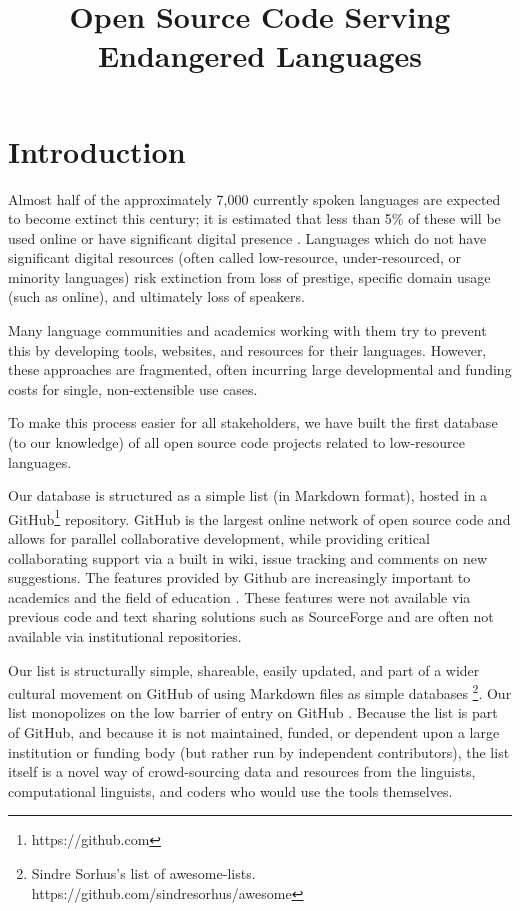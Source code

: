 \documentclass[10pt, a4paper]{article}
\title{Open Source Code Serving Endangered Languages}
\begin{document}
\maketitleabstract

\section{Introduction}

Almost half of the approximately 7,000 currently spoken languages are expected to
become extinct this century; it is estimated that less than 5\% of these will be used online or have significant digital presence \cite{kornai2013digital}. Languages which do not have significant digital resources (often called low-resource, under-resourced, or minority languages) risk extinction from loss of prestige, specific domain usage (such as online), and ultimately loss of speakers.

Many language communities and academics working with them try to prevent this by developing
tools, websites, and resources for their languages. However, these approaches are fragmented,
often incurring large developmental and funding costs for single, non-extensible use cases. 

To make this process easier for all stakeholders, we have built the first database (to our knowledge) of all open source code projects related to low-resource languages.

Our database is structured as a simple list (in Markdown format), hosted in a GitHub\footnote{https://github.com} repository. GitHub is the largest online network of open source code and allows for parallel collaborative development, while providing critical collaborating support via a built in wiki, issue tracking and comments on new suggestions. The features provided by Github are increasingly important to academics and the field of education \cite{zagalsky2015}. These features were not available via previous code and text sharing solutions such as SourceForge and are often not available via institutional repositories. 

Our list is structurally simple, shareable, easily updated, and part of a wider cultural movement on GitHub of using Markdown files as simple databases \footnote{Sindre Sorhus's list of awesome-lists. https://github.com/sindresorhus/awesome}. Our list monopolizes on the low barrier of entry on GitHub \cite{storey2014}. Because the list is part of GitHub, and because it is not maintained, funded, or dependent upon a large institution or funding body (but rather run by independent contributors), the list itself is a novel way of crowd-sourcing data and resources from the linguists, computational linguists, and coders who would use the tools themselves. 
\end{document}
